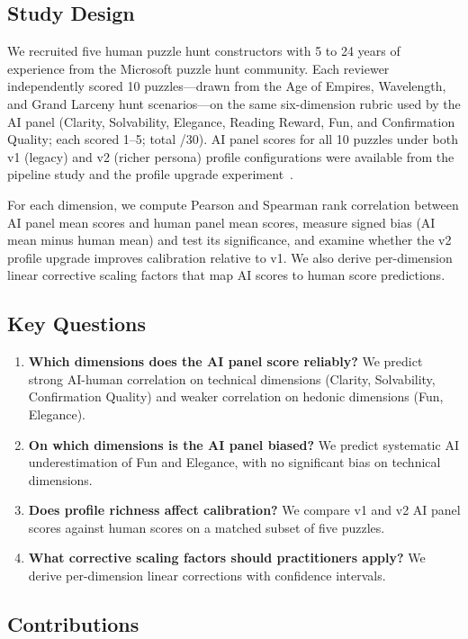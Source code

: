 \subsection*{Study Design}

We recruited five human puzzle hunt constructors with 5 to 24 years of experience from the Microsoft puzzle hunt community. Each reviewer independently scored 10 puzzles---drawn from the Age of Empires, Wavelength, and Grand Larceny hunt scenarios---on the same six-dimension rubric used by the AI panel (Clarity, Solvability, Elegance, Reading Reward, Fun, and Confirmation Quality; each scored 1--5; total /30). AI panel scores for all 10 puzzles under both v1 (legacy) and v2 (richer persona) profile configurations were available from the pipeline study and the profile upgrade experiment~\cite{dellaLibera2025taxonomy}.

For each dimension, we compute Pearson and Spearman rank correlation between AI panel mean scores and human panel mean scores, measure signed bias (AI mean minus human mean) and test its significance, and examine whether the v2 profile upgrade improves calibration relative to v1. We also derive per-dimension linear corrective scaling factors that map AI scores to human score predictions.

\subsection*{Key Questions}

\begin{enumerate}
  \item \textbf{Which dimensions does the AI panel score reliably?} We predict strong AI-human correlation on technical dimensions (Clarity, Solvability, Confirmation Quality) and weaker correlation on hedonic dimensions (Fun, Elegance).
  \item \textbf{On which dimensions is the AI panel biased?} We predict systematic AI underestimation of Fun and Elegance, with no significant bias on technical dimensions.
  \item \textbf{Does profile richness affect calibration?} We compare v1 and v2 AI panel scores against human scores on a matched subset of five puzzles.
  \item \textbf{What corrective scaling factors should practitioners apply?} We derive per-dimension linear corrections with confidence intervals.
\end{enumerate}

\subsection*{Contributions}

